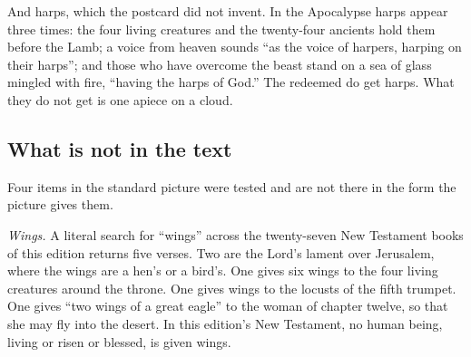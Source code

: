 And harps, which the postcard did not invent. In the Apocalypse harps appear three times: the four living creatures and the twenty-four ancients hold them before the Lamb; a voice from heaven sounds ``as the voice of harpers, harping on their harps''; and those who have overcome the beast stand on a sea of glass mingled with fire, ``having the harps of God.'' The redeemed do get harps. What they do not get is one apiece on a cloud.

\subsection{What is not in the text}

Four items in the standard picture were tested and are not there in the form the picture gives them.

\emph{Wings.} A literal search for ``wings'' across the twenty-seven New Testament books of this edition returns five verses. Two are the Lord's lament over Jerusalem, where the wings are a hen's or a bird's. One gives six wings to the four living creatures around the throne. One gives wings to the locusts of the fifth trumpet. One gives ``two wings of a great eagle'' to the woman of chapter twelve, so that she may fly into the desert. In this edition's New Testament, no human being, living or risen or blessed, is given wings.

